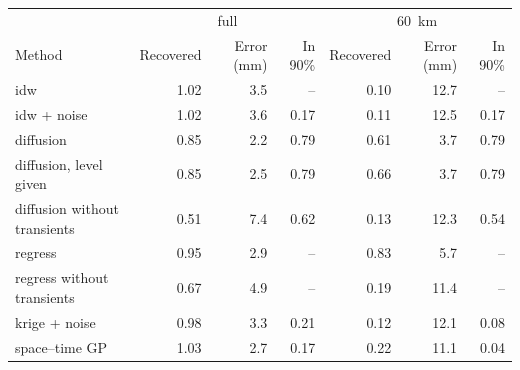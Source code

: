 \begin{tabular}{lrrrrrr}
\toprule
 & \multicolumn{3}{c}{full} & \multicolumn{3}{c}{60~km} \\
Method & Recovered & Error (mm) & In 90\% & Recovered & Error (mm) & In 90\% \\
\midrule
idw & 1.02 & 3.5 & -- & 0.10 & 12.7 & -- \\
idw + noise & 1.02 & 3.6 & 0.17 & 0.11 & 12.5 & 0.17 \\
diffusion & 0.85 & 2.2 & 0.79 & 0.61 & 3.7 & 0.79 \\
diffusion, level given & 0.85 & 2.5 & 0.79 & 0.66 & 3.7 & 0.79 \\
diffusion without transients & 0.51 & 7.4 & 0.62 & 0.13 & 12.3 & 0.54 \\
regress & 0.95 & 2.9 & -- & 0.83 & 5.7 & -- \\
regress without transients & 0.67 & 4.9 & -- & 0.19 & 11.4 & -- \\
krige + noise & 0.98 & 3.3 & 0.21 & 0.12 & 12.1 & 0.08 \\
space--time GP & 1.03 & 2.7 & 0.17 & 0.22 & 11.1 & 0.04 \\
\bottomrule
\end{tabular}
